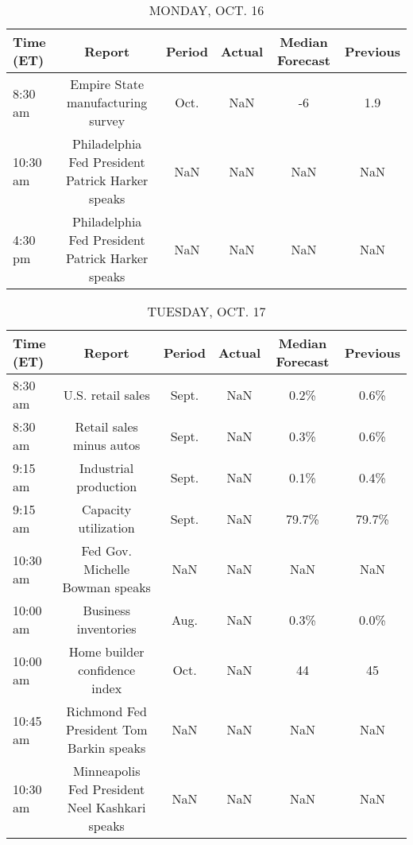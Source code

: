 \documentclass{article}%
\begin{document}
%
\normalsize%


\begin{table}[htbp]%
\caption{MONDAY, OCT. 16}%
\centering%
\begin{adjustbox}{width=1\textwidth}%
\begin{tabular}{lccccc}
\toprule
Time (ET) &                                           Report & Period & Actual & Median Forecast & Previous \\
\midrule
  8:30 am &                Empire State manufacturing survey &   Oct. &    NaN &              -6 &      1.9 \\
 10:30 am & Philadelphia Fed President Patrick Harker speaks &    NaN &    NaN &             NaN &      NaN \\
  4:30 pm & Philadelphia Fed President Patrick Harker speaks &    NaN &    NaN &             NaN &      NaN \\
\bottomrule
\end{tabular}
%
\end{adjustbox}%
\end{table}

%


\begin{table}[htbp]%
\caption{TUESDAY, OCT. 17}%
\centering%
\begin{adjustbox}{width=1\textwidth}%
\begin{tabular}{lccccc}
\toprule
Time (ET) &                                         Report & Period & Actual & Median Forecast & Previous \\
\midrule
  8:30 am &                              U.S. retail sales &  Sept. &    NaN &            0.2\% &     0.6\% \\
  8:30 am &                       Retail sales minus autos &  Sept. &    NaN &            0.3\% &     0.6\% \\
  9:15 am &                          Industrial production &  Sept. &    NaN &            0.1\% &     0.4\% \\
  9:15 am &                           Capacity utilization &  Sept. &    NaN &           79.7\% &    79.7\% \\
 10:30 am &                Fed Gov. Michelle Bowman speaks &    NaN &    NaN &             NaN &      NaN \\
 10:00 am &                           Business inventories &   Aug. &    NaN &            0.3\% &     0.0\% \\
 10:00 am &                  Home builder confidence index &   Oct. &    NaN &              44 &       45 \\
 10:45 am &       Richmond Fed President Tom Barkin speaks &    NaN &    NaN &             NaN &      NaN \\
 10:30 am & Minneapolis Fed President Neel Kashkari speaks &    NaN &    NaN &             NaN &      NaN \\
\bottomrule
\end{tabular}
%
\end{adjustbox}%
\end{table}
\end{document}

